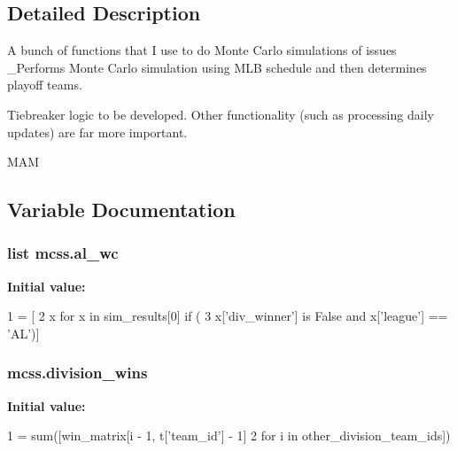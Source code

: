 \subsection{Detailed Description}
\begin{DoxyVerb}A bunch of functions that I use to do Monte Carlo simulations of issues
_Performs Monte Carlo simulation using MLB
schedule and then determines playoff teams.

Tiebreaker logic to be developed.
Other functionality (such as processing daily updates)
are far more important.

MAM\end{DoxyVerb}
 

\subsection{Variable Documentation}
\subsubsection[{\texorpdfstring{al\+\_\+wc}{al_wc}}]{\setlength{\rightskip}{0pt plus 5cm}list mcss.\+al\+\_\+wc}\hypertarget{namespacemcss_a196b761c6008151bda7257e9823cab63}{}\label{namespacemcss_a196b761c6008151bda7257e9823cab63}
{\bfseries Initial value\+:}
\begin{DoxyCode}
1 = [
2             x \textcolor{keywordflow}{for} x \textcolor{keywordflow}{in} sim\_results[0] \textcolor{keywordflow}{if} (
3                 x[\textcolor{stringliteral}{'div\_winner'}] \textcolor{keywordflow}{is} \textcolor{keyword}{False} \textcolor{keywordflow}{and} x[\textcolor{stringliteral}{'league'}] == \textcolor{stringliteral}{'AL'})]
\end{DoxyCode}
\subsubsection[{\texorpdfstring{division\+\_\+wins}{division_wins}}]{\setlength{\rightskip}{0pt plus 5cm}mcss.\+division\+\_\+wins}\hypertarget{namespacemcss_ad1c91060a8b2a8e7539fe2af56de63c2}{}\label{namespacemcss_ad1c91060a8b2a8e7539fe2af56de63c2}
{\bfseries Initial value\+:}
\begin{DoxyCode}
1 = sum([win\_matrix[i - 1, t[\textcolor{stringliteral}{'team\_id'}] - 1]
2                                      \textcolor{keywordflow}{for} i \textcolor{keywordflow}{in} other\_division\_team\_ids])
\end{DoxyCode}
